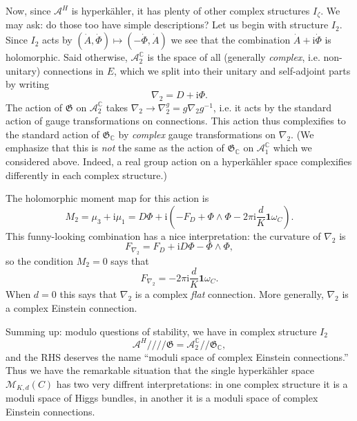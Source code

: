 \documentclass[12pt,letterpaper,reqno]{article}
\numberwithin{equation}{section}
\newcommand{\fG}{{\mathfrak G}}
\newcommand{\cM}{\ensuremath{\mathcal M}}
\newcommand{\cA}{\ensuremath{\mathcal A}}
\newcommand{\C}{\ensuremath{\mathbb C}}
\newcommand{\kq}{/\!\!/}
\newcommand{\hk}{hyperk\"ahler\xspace}
\newcommand{\hkq}{/\!\!/\!\!/\!\!/}
\newcommand{\I}{{\mathrm i}}
\newcommand\bid{{\mathbf 1}}
\newcommand{\ti}[1]{\textit{#1}}
\begin{document}
Now, since $\cA^H$ is \hk, it has plenty of other complex structures
$I_\zeta$. We may ask: do those too have simple descriptions?
Let us begin with structure $I_2$. Since $I_2$ acts by
$(\dot A, \dot \Phi) \mapsto (-\dot \Phi, \dot A)$
we see that the combination $\dot A + \I \dot \Phi$
is holomorphic.
Said otherwise, $\cA^\C_2$ is the space of all
(generally \ti{complex}, i.e. non-unitary)
connections in $E$, which we split into their unitary and self-adjoint parts
by writing
\begin{equation}
  \nabla_2 = D + \I \Phi.
\end{equation}
The action of $\fG$ on $\cA^\C_2$ takes
$\nabla_2 \to \nabla_2^g = g \nabla_2 g^{-1}$, i.e. it acts by
the standard action of gauge transformations on connections.
This action thus complexifies to the standard action of $\fG_\C$ by
\ti{complex} gauge transformations on $\nabla_2$.
(We emphasize that this is \ti{not} the same as the action
of $\fG_\C$ on $\cA^\C_1$
which we considered above. Indeed, a real group action on a \hk space
complexifies differently in each complex structure.)

The holomorphic moment
map for this action is
\begin{equation}
  M_2 = \mu_3 + \I \mu_1 = D \Phi + \I \left(-F_D + \Phi \wedge \Phi - 2 \pi \I \frac{d}{K} \bid \omega_C\right).
\end{equation}
This funny-looking combination has a nice interpretation:
the curvature of $\nabla_2$ is
\begin{equation}
  F_{\nabla_2} = F_D + \I D\Phi - \Phi \wedge \Phi,
\end{equation}
so the condition $M_2 = 0$ says that
\begin{equation}
  F_{\nabla_2} = - 2\pi \I \frac{d}{K} \bid \omega_C.
\end{equation}
When $d=0$ this says that $\nabla_2$ is a complex \ti{flat}
connection. More generally, $\nabla_2$ is a complex Einstein connection.

Summing up: modulo questions of stability, we have in complex
structure $I_2$
\begin{equation}
  \cA^H \hkq \fG = \cA_2^\C \kq \fG_\C,
\end{equation}
and the RHS deserves the name ``moduli space of complex Einstein connections.''
Thus we have the remarkable situation that the single \hk space
$\cM_{K,d}(C)$ has two very diffrent interpretations:
in one complex structure it is a moduli space of Higgs bundles,
in another it is a moduli space of complex Einstein connections.
\end{document}
